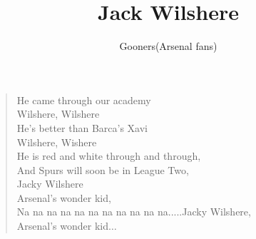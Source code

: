 \documentclass[a4paper,12pt]{article}
\title{Jack Wilshere}
\author{Gooners(Arsenal fans)}
\date{}
\begin{document}
	
	\maketitle
	
	\begin{verse}
		
		He came through our academy \\
		Wilshere, Wilshere \\
		He's better than Barca's Xavi \\ 
		Wilshere, Wishere \\
		He is red and white through and through, \\
		And Spurs will soon be in League Two, \\
		Jacky Wilshere \\
		Arsenal's wonder kid, \\
		Na na na na na na na na na na na.....Jacky Wilshere, \\ 
		Arsenal's wonder kid$\ldots$
		
	\end{verse}
	
\end{document}

